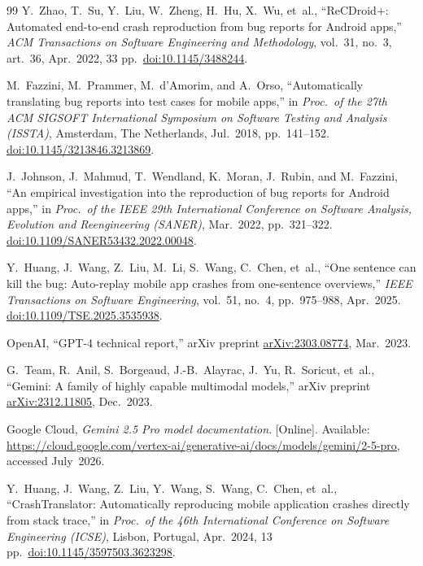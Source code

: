 \documentclass[10pt,conference,a4paper]{IEEEtran}
\begin{document}
\begin{thebibliography}{99}
  Y.~Zhao, T.~Su, Y.~Liu, W.~Zheng, H.~Hu, X.~Wu, et~al.,
  ``ReCDroid+: Automated end-to-end crash reproduction from bug reports
  for Android apps,''
  \emph{ACM Transactions on Software Engineering and Methodology},
  vol.~31, no.~3, art.~36, Apr.~2022, 33 pp.\
  \href{https://doi.org/10.1145/3488244}{doi:10.1145/3488244}.

  M.~Fazzini, M.~Prammer, M.~d'Amorim, and A.~Orso,
  ``Automatically translating bug reports into test cases for mobile apps,''
  in \emph{Proc.\ of the 27th ACM SIGSOFT International Symposium on
  Software Testing and Analysis (ISSTA)}, Amsterdam, The Netherlands,
  Jul.~2018, pp.~141--152.
  \href{https://doi.org/10.1145/3213846.3213869}{doi:10.1145/3213846.3213869}.

  J.~Johnson, J.~Mahmud, T.~Wendland, K.~Moran, J.~Rubin, and M.~Fazzini,
  ``An empirical investigation into the reproduction of bug reports for
  Android apps,''
  in \emph{Proc.\ of the IEEE 29th International Conference on Software
  Analysis, Evolution and Reengineering (SANER)},
  Mar.~2022, pp.~321--322.
  \href{https://doi.org/10.1109/SANER53432.2022.00048}{doi:10.1109/SANER53432.2022.00048}.

  Y.~Huang, J.~Wang, Z.~Liu, M.~Li, S.~Wang, C.~Chen, et~al.,
  ``One sentence can kill the bug: Auto-replay mobile app crashes from
  one-sentence overviews,''
  \emph{IEEE Transactions on Software Engineering}, vol.~51, no.~4,
  pp.~975--988, Apr.\ 2025.
  \href{https://doi.org/10.1109/TSE.2025.3535938}{doi:10.1109/TSE.2025.3535938}.


  OpenAI, ``GPT-4 technical report,''
  arXiv preprint \href{https://arxiv.org/abs/2303.08774}{arXiv:2303.08774},
  Mar.~2023.

  G.~Team, R.~Anil, S.~Borgeaud, J.-B.~Alayrac, J.~Yu, R.~Soricut, et~al.,
  ``Gemini: A family of highly capable multimodal models,''
  arXiv preprint \href{https://arxiv.org/abs/2312.11805}{arXiv:2312.11805},
  Dec.~2023.

  Google Cloud, \emph{Gemini 2.5 Pro model documentation}.
  [Online]. Available:
  \url{https://cloud.google.com/vertex-ai/generative-ai/docs/models/gemini/2-5-pro},
  accessed July~2026.

  Y.~Huang, J.~Wang, Z.~Liu, Y.~Wang, S.~Wang, C.~Chen, et~al.,
  ``CrashTranslator: Automatically reproducing mobile application crashes
  directly from stack trace,''
  in \emph{Proc.\ of the 46th International Conference on Software
  Engineering (ICSE)}, Lisbon, Portugal, Apr.~2024, 13 pp.\
  \href{https://doi.org/10.1145/3597503.3623298}{doi:10.1145/3597503.3623298}.


\end{thebibliography}
\end{document}
